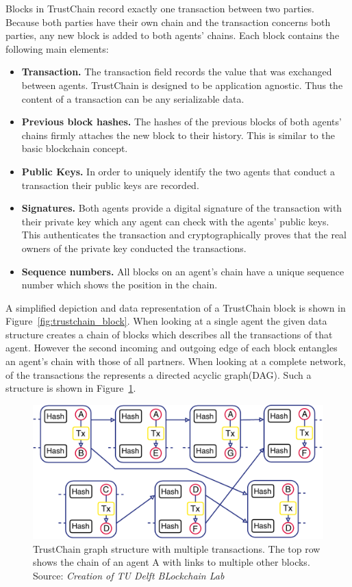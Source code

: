 Blocks in TrustChain record exactly one transaction between two parties. Because both parties have 
their own chain and the transaction concerns both parties, any new block is added to both agents'
chains. Each block contains the following main elements:

\begin{itemize}
    \item \textbf{Transaction.} The transaction field records the value that was exchanged between agents.
    TrustChain is designed to be application agnostic. Thus the content of a transaction can be any 
    serializable data. 
    \item \textbf{Previous block hashes.} The hashes of the previous blocks of both agents' chains 
    firmly attaches the new block to their history. This is similar to the basic blockchain concept.
    \item \textbf{Public Keys.} In order to uniquely identify the two agents that conduct a transaction
    their public keys are recorded.
    \item \textbf{Signatures.} Both agents provide a digital signature of the transaction with their 
    private key which any agent can check with the agents' public keys. This authenticates the 
    transaction and cryptographically proves that the real owners of the private key conducted the 
    transactions.
    \item \textbf{Sequence numbers.} All blocks on an agent's chain have a unique sequence number 
    which shows the position in the chain. 
\end{itemize}

A simplified depiction and data representation of a TrustChain block is shown in Figure~\ref{fig:trustchain_block}. When 
looking at a single agent the given data structure creates a chain of blocks which describes all the
transactions of that agent. However the second incoming and outgoing edge of each block entangles an
agent's chain with those of all partners. When looking at a complete network, of the transactions the
represents a directed acyclic graph(DAG). Such a structure is shown in Figure~\ref{fig:trustchain_graph}.

\begin{figure}
    \centering
    \includegraphics[width=\textwidth]{images/trustchain_graph.pdf}
    \caption{TrustChain graph structure with multiple transactions. The top row shows the chain of
    an agent A with links to multiple other blocks. Source: \textit{Creation of TU Delft BLockchain Lab}}
    \label{fig:trustchain_graph}
\end{figure}


